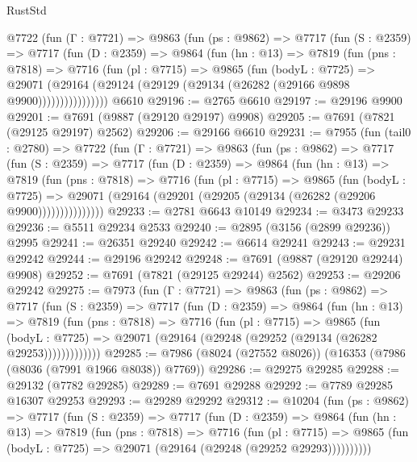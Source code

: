\begin{lexlean}{RustStd}
\begin{coremodule}
      @7722
        (fun (Γ : @7721) =>
        @9863
          (fun (ps : @9862) =>
          @7717
            (fun (S : @2359) =>
            @7717
              (fun (D : @2359) =>
              @9864
                (fun (hn : @13) =>
                @7819
                  (fun (pns : @7818) =>
                  @7716
                    (fun (pl : @7715) =>
                    @9865
                      (fun (bodyL : @7725) =>
                      @29071
                        (@29164 (@29124 (@29129 (@29134 (@26282 (@29166 @9898 @9900))))))))))))))))
    @6610
@29196 := @2765 @6610
@29197 := @29196 @9900
@29201 := @7691 (@9887 (@29120 @29197) @9908)
@29205 := @7691 (@7821 (@29125 @29197) @2562)
@29206 := @29166 @6610
@29231 := @7955
    (fun (tail0 : @2780) =>
    @7722
      (fun (Γ : @7721) =>
      @9863
        (fun (ps : @9862) =>
        @7717
          (fun (S : @2359) =>
          @7717
            (fun (D : @2359) =>
            @9864
              (fun (hn : @13) =>
              @7819
                (fun (pns : @7818) =>
                @7716
                  (fun (pl : @7715) =>
                  @9865
                    (fun (bodyL : @7725) =>
                    @29071 (@29164 (@29201 (@29205 (@29134 (@26282 (@29206 @9900)))))))))))))))
@29233 := @2781 @6643 @10149
@29234 := @3473 @29233
@29236 := @5511 @29234 @2533
@29240 := @2895 (@3156 (@2899 @29236)) @2995
@29241 := @26351 @29240
@29242 := @6614 @29241
@29243 := @29231 @29242
@29244 := @29196 @29242
@29248 := @7691 (@9887 (@29120 @29244) @9908)
@29252 := @7691 (@7821 (@29125 @29244) @2562)
@29253 := @29206 @29242
@29275 := @7973
    (fun (Γ : @7721) =>
    @9863
      (fun (ps : @9862) =>
      @7717
        (fun (S : @2359) =>
        @7717
          (fun (D : @2359) =>
          @9864
            (fun (hn : @13) =>
            @7819
              (fun (pns : @7818) =>
              @7716
                (fun (pl : @7715) =>
                @9865
                  (fun (bodyL : @7725) =>
                  @29071 (@29164 (@29248 (@29252 (@29134 (@26282 @29253)))))))))))))
@29285 := @7986 (@8024 (@27552 @8026)) (@16353 (@7986 (@8036 (@7991 @1966 @8038)) @7769))
@29286 := @29275 @29285
@29288 := @29132 (@7782 @29285)
@29289 := @7691 @29288
@29292 := @7789 @29285 @16307 @29253
@29293 := @29289 @29292
@29312 := @10204
    (fun (ps : @9862) =>
    @7717
      (fun (S : @2359) =>
      @7717
        (fun (D : @2359) =>
        @9864
          (fun (hn : @13) =>
          @7819
            (fun (pns : @7818) =>
            @7716
              (fun (pl : @7715) =>
              @9865 (fun (bodyL : @7725) => @29071 (@29164 (@29248 (@29252 @29293))))))))))

\end{coremodule}
\end{lexlean}

